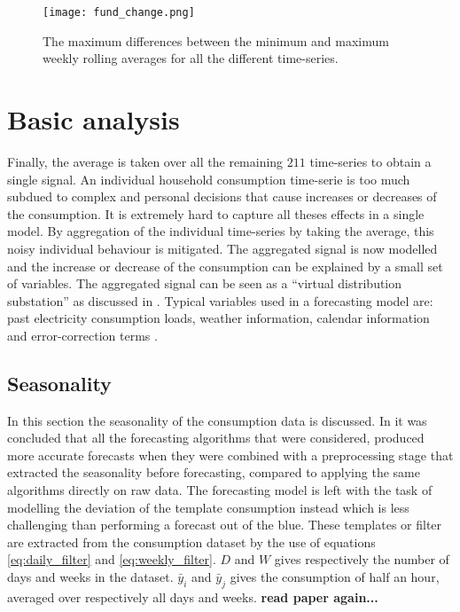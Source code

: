 \begin{figure}[h!]
	\centering
	\texttt{[image: fund\_change.png]}
	\caption{The maximum differences between the minimum and maximum weekly rolling averages for all the different time-series.}
	\label{fig:fund_change}
\end{figure}




\section{Basic analysis}\label{s:Basic analysis}
Finally, the average is taken over all the remaining $211$ time-series to obtain a single signal. An individual household consumption time-serie is too much subdued to complex and personal decisions that cause increases or decreases of the consumption. It is extremely hard to capture all theses effects in a single model. By aggregation of the individual time-series by taking the average, this noisy individual behaviour is mitigated. The aggregated signal is now modelled and the increase or decrease of the consumption can be explained by a small set of variables. The aggregated signal can be seen as a ``virtual distribution substation'' as discussed in \cite{Hoverstad2015}. Typical variables used in a forecasting model are: past electricity consumption loads, weather information, calendar information and error-correction terms \cite{loadforecastingmoor}.

\subsection{Seasonality}
In this section the seasonality of the consumption data is discussed. In \cite{Hoverstad2015}it was concluded that all the forecasting algorithms that were considered, produced more accurate forecasts when they were combined with a preprocessing stage that extracted the seasonality before forecasting, compared to applying the same algorithms directly on raw data. The forecasting model is left with the task of modelling the deviation of the template consumption instead which is less challenging than performing a forecast out of the blue. These templates or filter are extracted from the consumption dataset by the use of equations \ref{eq:daily_filter} and \ref{eq:weekly_filter}. $ D $ and $ W $ gives respectively the number of days and weeks in the dataset. $\bar{y}_i$ and $\bar{y}_j$ gives the consumption of half an hour, averaged over respectively all days and weeks.   \textbf{read paper again...}

